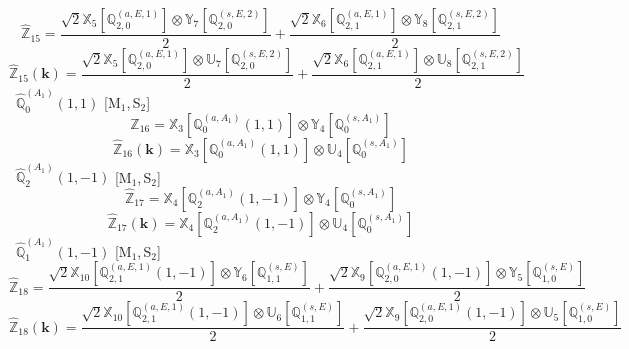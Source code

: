 \documentclass[fleqn,10pt,landscape]{article}
\begin{document}
\begin{itemize}
\begin{dmath*}
\hat{\mathbb{Z}}_{15}=\frac{\sqrt{2} \mathbb{X}_{5}[\mathbb{Q}_{2,0}^{(a,E,1)}] \otimes\mathbb{Y}_{7}[\mathbb{Q}_{2,0}^{(s,E,2)}]}{2} + \frac{\sqrt{2} \mathbb{X}_{6}[\mathbb{Q}_{2,1}^{(a,E,1)}] \otimes\mathbb{Y}_{8}[\mathbb{Q}_{2,1}^{(s,E,2)}]}{2}
\end{dmath*}
\begin{dmath*}
\hat{\mathbb{Z}}_{15}(\bm{k})=\frac{\sqrt{2} \mathbb{X}_{5}[\mathbb{Q}_{2,0}^{(a,E,1)}] \otimes\mathbb{U}_{7}[\mathbb{Q}_{2,0}^{(s,E,2)}]}{2} + \frac{\sqrt{2} \mathbb{X}_{6}[\mathbb{Q}_{2,1}^{(a,E,1)}] \otimes\mathbb{U}_{8}[\mathbb{Q}_{2,1}^{(s,E,2)}]}{2}
\end{dmath*}
\vspace{4mm}
\noindent {} $\,\,\,\hat{\mathbb{Q}}_{0}^{(A_{1})}(1,1)$ [M$_{1}$,\,S$_{2}$]
\begin{dmath*}
\hat{\mathbb{Z}}_{16}=\mathbb{X}_{3}[\mathbb{Q}_{0}^{(a,A_{1})}(1,1)] \otimes\mathbb{Y}_{4}[\mathbb{Q}_{0}^{(s,A_{1})}]
\end{dmath*}
\begin{dmath*}
\hat{\mathbb{Z}}_{16}(\bm{k})=\mathbb{X}_{3}[\mathbb{Q}_{0}^{(a,A_{1})}(1,1)] \otimes\mathbb{U}_{4}[\mathbb{Q}_{0}^{(s,A_{1})}]
\end{dmath*}
\vspace{4mm}
\noindent {} $\,\,\,\hat{\mathbb{Q}}_{2}^{(A_{1})}(1,-1)$ [M$_{1}$,\,S$_{2}$]
\begin{dmath*}
\hat{\mathbb{Z}}_{17}=\mathbb{X}_{4}[\mathbb{Q}_{2}^{(a,A_{1})}(1,-1)] \otimes\mathbb{Y}_{4}[\mathbb{Q}_{0}^{(s,A_{1})}]
\end{dmath*}
\begin{dmath*}
\hat{\mathbb{Z}}_{17}(\bm{k})=\mathbb{X}_{4}[\mathbb{Q}_{2}^{(a,A_{1})}(1,-1)] \otimes\mathbb{U}_{4}[\mathbb{Q}_{0}^{(s,A_{1})}]
\end{dmath*}
\vspace{4mm}
\noindent {} $\,\,\,\hat{\mathbb{Q}}_{1}^{(A_{1})}(1,-1)$ [M$_{1}$,\,S$_{2}$]
\begin{dmath*}
\hat{\mathbb{Z}}_{18}=\frac{\sqrt{2} \mathbb{X}_{10}[\mathbb{Q}_{2,1}^{(a,E,1)}(1,-1)] \otimes\mathbb{Y}_{6}[\mathbb{Q}_{1,1}^{(s,E)}]}{2} + \frac{\sqrt{2} \mathbb{X}_{9}[\mathbb{Q}_{2,0}^{(a,E,1)}(1,-1)] \otimes\mathbb{Y}_{5}[\mathbb{Q}_{1,0}^{(s,E)}]}{2}
\end{dmath*}
\begin{dmath*}
\hat{\mathbb{Z}}_{18}(\bm{k})=\frac{\sqrt{2} \mathbb{X}_{10}[\mathbb{Q}_{2,1}^{(a,E,1)}(1,-1)] \otimes\mathbb{U}_{6}[\mathbb{Q}_{1,1}^{(s,E)}]}{2} + \frac{\sqrt{2} \mathbb{X}_{9}[\mathbb{Q}_{2,0}^{(a,E,1)}(1,-1)] \otimes\mathbb{U}_{5}[\mathbb{Q}_{1,0}^{(s,E)}]}{2}

\end{dmath*}
\end{itemize}
\end{document}
